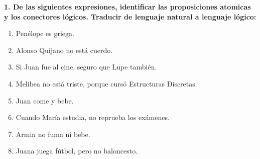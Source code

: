 \noindent\textbf{1. De las siguientes expresiones, identificar las proposiciones atomicas y los conectores lógicos. Traducir de lenguaje natural a lenguaje lógico:}

\begin{multicols}{2}
	\begin{enumerate}[label=\alph*)]
		\item Penélope es griega.
		\item Alonso Quijano no está cuerdo.
		\item Si Juan fue al cine, seguro que Lupe también.
		\item Melibea no está triste, porque cursó Estructuras Discretas.
		\item Juan come y bebe.
		\item Cuando María estudia, no reprueba los exámenes.
		\item Armin no fuma ni bebe.
		\item Juana juega fútbol, pero no baloncesto.
	\end{enumerate}
\end{multicols}

